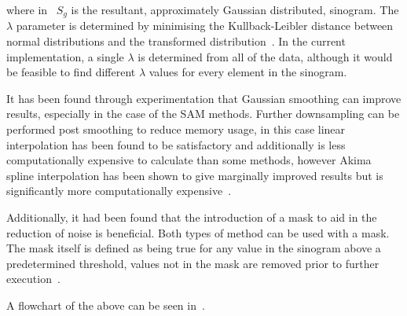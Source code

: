                 \noindent where in~ $S_g$ is the resultant, approximately Gaussian distributed, sinogram. The $\lambda$ parameter is determined by minimising the Kullback-Leibler distance between normal distributions and the transformed distribution~. In the current implementation, a single $\lambda$ is determined from all of the data, although it would be feasible to find different $\lambda$ values for every element in the sinogram.
                    
                It has been found through experimentation that Gaussian smoothing can improve results, especially in the case of the \gls{SAM} methods. Further downsampling can be performed post smoothing to reduce memory usage, in this case linear interpolation has been found to be satisfactory and additionally is less computationally expensive to calculate than some methods, however Akima spline interpolation has been shown to give marginally improved results but is significantly more computationally expensive~.
                        
                Additionally, it had been found that the introduction of a mask to aid in the reduction of noise is beneficial. Both types of method can be used with a mask. The mask itself is defined as being true for any value in the sinogram above a predetermined threshold, values not in the mask are removed prior to further execution~.
                
                A flowchart of the above can be seen in~.
            

